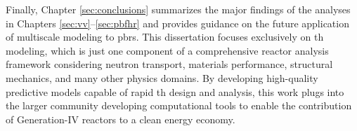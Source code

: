 Finally, Chapter \ref{sec:conclusions} summarizes the major findings of the analyses in Chapters \ref{sec:vv}--\ref{sec:pbfhr} and provides guidance on the future application of multiscale modeling to \glspl{pbr}. This dissertation focuses exclusively on \gls{th} modeling, which is just one component of a comprehensive reactor analysis framework considering neutron transport, materials performance, structural mechanics, and many other physics domains. By developing high-quality predictive models capable of rapid \gls{th} design and analysis, this work plugs into the larger community developing computational tools to enable the contribution of Generation-IV reactors to a clean energy economy.


